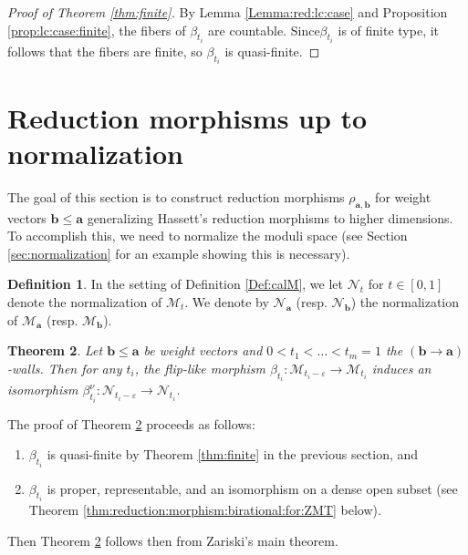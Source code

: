 \documentclass[11pt]{amsart}
\newtheorem{theorem}{Theorem}[section]
\theoremstyle{definition}
\newtheorem{definition}[theorem]{Definition}
\theoremstyle{remark}
\newcommand{\sM}{\mathscr{M}}
\newcommand{\sN}{\mathscr{N}}
\newcommand{\bfa}{\mathbf{a}}
\newcommand{\bfb}{\mathbf{b}}
\begin{document}
	\begin{proof}[Proof of Theorem \ref{thm:finite}]By Lemma \ref{Lemma:red:lc:case} and Proposition \ref{prop:lc:case:finite}, the fibers of $\beta_{t_i}$ are countable. Since$\beta_{t_i}$ is of finite type, it follows that the fibers are finite, so $\beta_{t_i}$ is quasi-finite.
	\end{proof}
	
	\section{Reduction morphisms up to normalization}\label{Section:reduction} 
	
	The goal of this section is to construct reduction morphisms $\rho_{\bfa, \bfb}$ for weight vectors $\bfb \le \bfa$ generalizing Hassett's reduction morphisms \cite[Theorem 4.1]{Hassett} to higher dimensions. To accomplish this, we need to normalize the moduli space (see Section \ref{sec:normalization} for an example showing this is necessary). 
	
	\begin{definition}\label{Def:calN} In the setting of Definition \ref{Def:calM}, we let $\sN_t$  for $t \in [0,1]$ denote the normalization of $\sM_t$. We denote by $\sN_\bfa$ (resp. $\sN_\bfb$) the normalization of $\sM_\bfa$ (resp. $\sM_{\bfb}$).  
	\end{definition}
	
	
	
	\begin{theorem}\label{theorem:reduction:are:iso} Let $\bfb \le \bfa$ be weight vectors and $0 < t_1 < \ldots < t_m = 1$ the $(\bfb \to \bfa)$-walls. Then for any $t_i$, the flip-like morphism $\beta_{t_i} : \sM_{t_i - \varepsilon} \to \sM_{t_i}$ induces an isomorphism $\beta_{t_i}^\nu:\sN_{t_i-\varepsilon} \to \sN_{t_i}$. \end{theorem}
	
	The proof of Theorem \ref{theorem:reduction:are:iso} proceeds as follows:
	\begin{enumerate}
		\item $\beta_{t_i}$ is quasi-finite by Theorem \ref{thm:finite} in the previous section, and
		\item $\beta_{t_i}$ is proper, representable, and an isomorphism on a dense open subset (see Theorem \ref{thm:reduction:morphism:birational:for:ZMT} below).
	\end{enumerate}
	Then Theorem \ref{theorem:reduction:are:iso} follows then from Zariski's main theorem.
	
\end{document}
